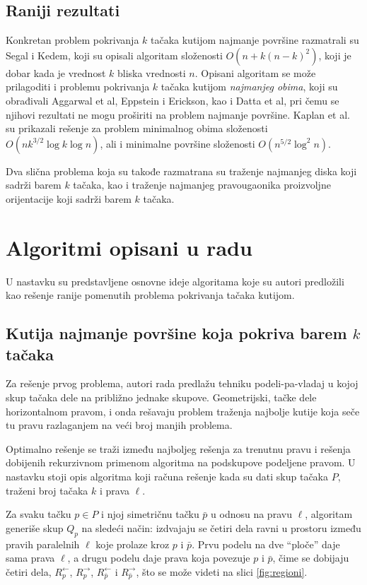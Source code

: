 \documentclass{article}
\begin{document}
\subsection{Raniji rezultati}

Konkretan problem pokrivanja $k$ tačaka kutijom najmanje površine razmatrali su Segal i Kedem, koji su opisali algoritam složenosti
$O ( n + k (n - k)^2 )$, koji je dobar kada je vrednost $k$ bliska vrednosti $n$. Opisani algoritam se može prilagoditi i problemu
pokrivanja $k$ tačaka kutijom {\em najmanjeg obima}, koji su obrađivali Aggarwal et al, Eppstein i Erickson, kao i Datta et al,
pri čemu se njihovi rezultati ne mogu proširiti na problem najmanje površine. Kaplan et al. su prikazali rešenje za problem minimalnog obima složenosti $O (n k^{3/2} \log k \log n)$, ali i minimalne površine složenosti $O (n^{5/2} \log^2 n)$.

Dva slična problema koja su takođe razmatrana su traženje najmanjeg diska koji sadrži barem $k$ tačaka, kao i traženje najmanjeg pravougaonika proizvoljne orijentacije koji sadrži barem $k$ tačaka.

\section{Algoritmi opisani u radu}

U nastavku su predstavljene osnovne ideje algoritama koje su autori predložili kao rešenje ranije pomenutih problema pokrivanja tačaka kutijom.

\subsection{Kutija najmanje površine koja pokriva barem $k$ tačaka}

Za rešenje prvog problema, autori rada predlažu tehniku podeli-pa-vladaj u kojoj skup tačaka dele na približno jednake skupove. Geometrijski,
tačke dele horizontalnom pravom, i onda rešavaju problem traženja najbolje kutije koja seče tu pravu razlaganjem na veći broj manjih problema.

Optimalno rešenje se traži između najboljeg rešenja za trenutnu pravu i rešenja dobijenih rekurzivnom primenom algoritma na podskupove
podeljene pravom. U nastavku stoji opis algoritma koji računa rešenje kada su dati skup tačaka $P$, traženi broj tačaka $k$ i prava $\ell$.

Za svaku tačku $p \in P$ i njoj simetričnu tačku $\bar{p}$ u odnosu na pravu $\ell$, algoritam generiše skup $Q_p$ na sledeći način:
izdvajaju se četiri dela ravni u prostoru između pravih paralelnih $\ell$ koje prolaze kroz $p$ i $\bar{p}$. Prvu podelu na dve ``ploče'' daje sama prava $\ell$, a drugu podelu daje prava koja povezuje $p$ i $\bar{p}$, čime se dobijaju četiri dela, $R_p^\leftarrow$, $R_p^\rightarrow$, $R_{\bar{p}}^\leftarrow$ i $R_{\bar{p}}^\rightarrow$, što se može videti na slici \ref{fig:regioni}.
\end{document}
